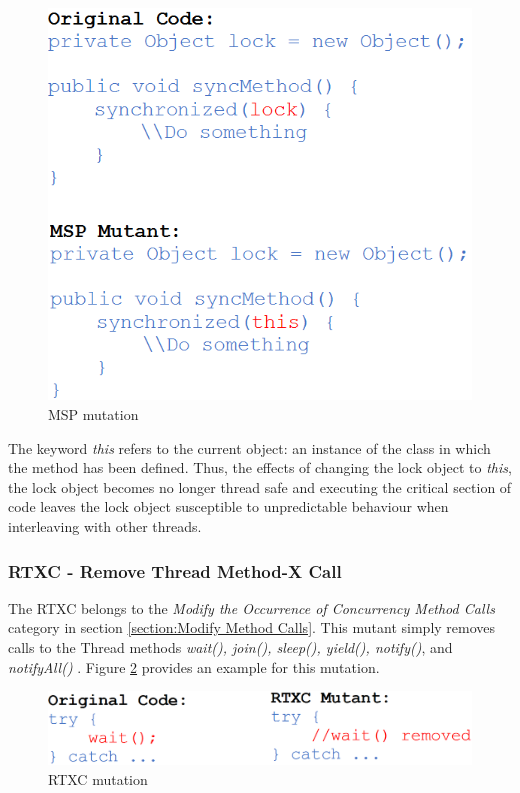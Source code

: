 \documentclass[a4paper,12pt]{article}
\begin{document}
\begin{figure}[h]
    \centering
    \includegraphics[scale = 0.6]{MSP.png}
    \caption{MSP mutation \citep{bradbury06}}
    \label{fig:MSP}
\end{figure}

The keyword \textit{this} refers to the current object: an instance of the class in which the method has been defined. Thus, the effects of changing the lock object to \textit{this}, the lock object becomes no longer thread safe and executing the critical section of code leaves the lock object susceptible to unpredictable behaviour when interleaving with other threads.  

\subsubsection{RTXC - Remove Thread Method-X Call}

The RTXC belongs to the \textit{Modify the Occurrence of Concurrency Method Calls} category in section \ref{section:Modify Method Calls}. This mutant simply removes calls to the Thread methods \textit{wait(), join(), sleep(), yield(), notify()}, and\textit{ notifyAll()} \citep{bradbury06}. Figure \ref{fig:RTXC} provides an example for this mutation.

\begin{figure}[h]
    \centering
    \includegraphics[scale = 0.35]{RTXC.png}
    \caption{RTXC mutation \citep{bradbury06}}
    \label{fig:RTXC}
\end{figure}
\end{document}
